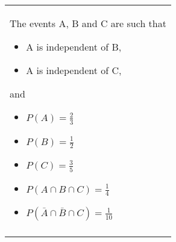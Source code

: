 \documentclass[a4paper,12pt]{article}
\begin{document}
\large
\begin{table}[ht!]
 \centering
 \begin{tabular}{|p{15cm}|}
 \hline
 \large
\noindent %
The events A, B and C are such that 

\begin{itemize} 
\item A is independent of B, 
\item A is independent of C, 
\end{itemize} 
 and 
\begin{multicols}{2}
\begin{itemize}
\item ${ \displaystyle P(A ) = \frac{2}{3} }$
\item ${ \displaystyle P(B ) =  \frac{1}{2} }$
\item ${ \displaystyle P(C ) = \frac{3}{5} }$
\item ${ \displaystyle P(A \cap B \cap C) = \frac{1}{4} }$
\item ${ \displaystyle P(\bar{A} \cap \bar{B} \cap C)  = \frac{1}{10} }$
\end{itemize} 
\end{multicols} \\
\\ \hline
  \end{tabular}
\end{table}
\end{document}
